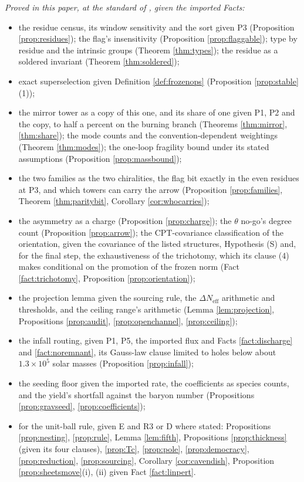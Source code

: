 \documentclass[11pt]{article}
\theoremstyle{definition}
\newcommand{\Neff}{N_{\mathrm{eff}}}
\begin{document}
\emph{Proved in this paper, at the standard of \cite{ButlerT1}, given the imported Facts:}
\begin{itemize}\setlength{\itemsep}{1pt}
\item the residue census, its window sensitivity and the sort given P3 (Proposition \ref{prop:residues}); the flag's insensitivity (Proposition \ref{prop:flaggable}); type by residue and the intrinsic groups (Theorem \ref{thm:types}); the residue as a soldered invariant (Theorem \ref{thm:soldered});
\item exact superselection given Definition \ref{def:frozenops} (Proposition \ref{prop:stable}(1));
\item the mirror tower as a copy of this one, and its share of one given P1, P2 and the copy, to half a percent on the burning branch (Theorems \ref{thm:mirror}, \ref{thm:share}); the mode counts and the convention-dependent weightings (Theorem \ref{thm:modes}); the one-loop fragility bound under its stated assumptions (Proposition \ref{prop:massbound});
\item the two families as the two chiralities, the flag bit exactly in the even residues at P3, and which towers can carry the arrow (Proposition \ref{prop:families}, Theorem \ref{thm:paritybit}, Corollary \ref{cor:whocarries});
\item the asymmetry as a charge (Proposition \ref{prop:charge}); the $\theta$ no-go's degree count (Proposition \ref{prop:arrow}); the CPT-covariance classification of the orientation, given the covariance of the listed structures, Hypothesis (S) and, for the final step, the exhaustiveness of the trichotomy, which its clause (4) makes conditional on the promotion of the frozen norm (Fact \ref{fact:trichotomy}, Proposition \ref{prop:orientation});
\item the projection lemma given the sourcing rule, the $\Delta\Neff$ arithmetic and thresholds, and the ceiling range's arithmetic (Lemma \ref{lem:projection}, Propositions \ref{prop:audit}, \ref{prop:openchannel}, \ref{prop:ceiling});
\item the infall routing, given P1, P5, the imported flux and Facts \ref{fact:discharge} and \ref{fact:noremnant}, its Gauss-law clause limited to holes below about $1.3 \times 10^{5}$ solar masses (Proposition \ref{prop:infall});
\item the seeding floor given the imported rate, the coefficients as species counts, and the yield's shortfall against the baryon number (Propositions \ref{prop:gravseed}, \ref{prop:coefficients});
\item for the unit-ball rule, given E and R3 or D where stated: Propositions \ref{prop:nesting}, \ref{prop:rule}, Lemma \ref{lem:fifth}, Propositions \ref{prop:thickness} (given its four clauses), \ref{prop:Tc}, \ref{prop:pole}, \ref{prop:democracy}, \ref{prop:reduction}, \ref{prop:sourcing}, Corollary \ref{cor:cavendish}, Proposition \ref{prop:sheetsmove}(i), (ii) given Fact \ref{fact:linpert}.
\end{itemize}
\end{document}
